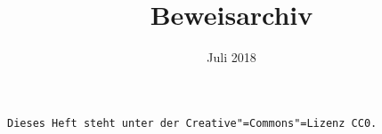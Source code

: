 \documentclass[a4paper,10pt,fleqn,twoside]{scrbook}
\title{Beweisarchiv}
\date{Juli 2018}
\numberwithin{equation}{chapter}
\theoremstyle{rmbox}
\begin{document}
\maketitle

\texttt{Dieses Heft steht unter der Creative"=Commons"=Lizenz CC0.}

\tableofcontents





\printindex
\end{document}
